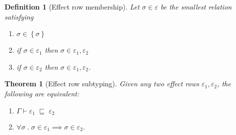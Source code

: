 \documentclass[12pt]{article}
\newtheorem{definition}{Definition}
\newtheorem{theorem}{Theorem}
\newcommand\type{\sigma}
\newcommand\row{\varepsilon}
\newcommand\rsingleton[1]{\left\{ #1 \right\}}
\newcommand\runion[2]{#1, #2}
\newcommand\context{\Gamma}
\newcommand\subsumes[3]{#1 \vdash #2 \; \sqsubseteq \; #3}
\begin{document}
  \begin{definition}[Effect row membership]
    Let $\type \in \row$ be the smallest relation satisfying
    \begin{enumerate}
      \item $\type \in \rsingleton{\type}$
      \item if $\type \in \row_1$ then $\type \in \runion{\row_1}{\row_2}$
      \item if $\type \in \row_2$ then $\type \in \runion{\row_1}{\row_2}$.
    \end{enumerate}
  \end{definition}

  \begin{theorem}[Effect row subtyping]
    Given any two effect rows $\row_1, \row_2$, the following are equivalent:
    \begin{enumerate}
      \item $\subsumes{\context}{\row_1}{\row_2}$
      \item $\forall \type \;.\; \type \in \row_1 \implies \type \in \row_2$.
    \end{enumerate}
  \end{theorem}
\end{document}
